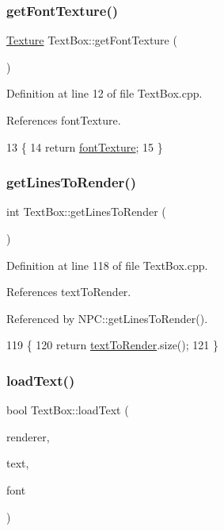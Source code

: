 \subsubsection{\texorpdfstring{get\+Font\+Texture()}{getFontTexture()}}
{\footnotesize\ttfamily \hyperlink{class_texture}{Texture} Text\+Box\+::get\+Font\+Texture (\begin{DoxyParamCaption}{ }\end{DoxyParamCaption})}



Definition at line 12 of file Text\+Box.\+cpp.



References font\+Texture.


\begin{DoxyCode}
13 \{
14     \textcolor{keywordflow}{return} \hyperlink{class_text_box_a94e1863fccbb2e8de3547aa89b8e85f0}{fontTexture};
15 \}
\end{DoxyCode}
\mbox{\label{class_text_box_a7c620113713b6b841ef7e183c1d81312}} 
\subsubsection{\texorpdfstring{get\+Lines\+To\+Render()}{getLinesToRender()}}
{\footnotesize\ttfamily int Text\+Box\+::get\+Lines\+To\+Render (\begin{DoxyParamCaption}{ }\end{DoxyParamCaption})}



Definition at line 118 of file Text\+Box.\+cpp.



References text\+To\+Render.



Referenced by N\+P\+C\+::get\+Lines\+To\+Render().


\begin{DoxyCode}
119 \{
120     \textcolor{keywordflow}{return} \hyperlink{class_text_box_a13ec32aabf23db2253af70f19a2bf1e9}{textToRender}.size();
121 \}
\end{DoxyCode}
\mbox{\label{class_text_box_add2f877e6715744908d5eb0c9c53e5a9}} 
\subsubsection{\texorpdfstring{load\+Text()}{loadText()}}
{\footnotesize\ttfamily bool Text\+Box\+::load\+Text (\begin{DoxyParamCaption}\item[{S\+D\+L\+\_\+\+Renderer $\ast$}]{renderer,  }\item[{std\+::string}]{text,  }\item[{T\+T\+F\+\_\+\+Font $\ast$}]{font }\end{DoxyParamCaption})}


